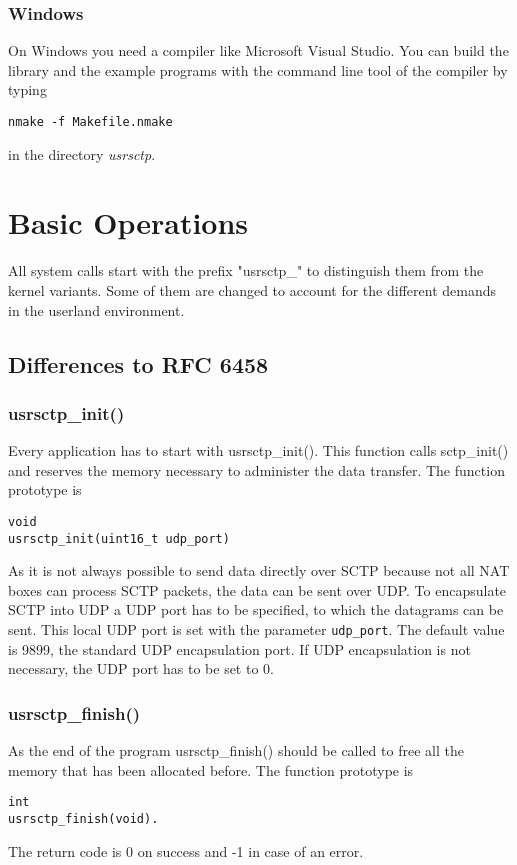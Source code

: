 \documentclass[a4paper]{article}
\begin{document}
\subsubsection{Windows}
On Windows you need a compiler like Microsoft Visual Studio. You can build the library and the
example programs with the command line tool of the compiler by typing
\begin{verbatim}
nmake -f Makefile.nmake
\end{verbatim}
in the directory \textit{usrsctp}.




\section{Basic Operations}
All system calls start with the prefix "usrsctp\_" to distinguish them from the kernel variants. 
Some of them are changed to account for the different demands in the userland environment. 

\subsection{Differences to RFC 6458}
\subsubsection{usrsctp\_init()}
Every application has to start with usrsctp\_init(). This function calls sctp\_init() and reserves
the memory necessary to administer the data transfer.
The function prototype is 
\begin{verbatim}
void
usrsctp_init(uint16_t udp_port)
\end{verbatim}
As it is not always possible to send data directly over SCTP because not all NAT boxes can
process SCTP packets, the data can be sent over UDP. To encapsulate SCTP into UDP
a UDP port has to be specified, to which the datagrams can be sent. This local UDP port  is set 
with the parameter \texttt{udp\_port}. The default value is 9899, the standard UDP encapsulation port.
If UDP encapsulation is not necessary, the UDP port has to be set to 0.

\subsubsection{usrsctp\_finish()}
As the end of the program usrsctp\_finish() should be called to free all the memory that has been
allocated before.
The function prototype is 
\begin{verbatim}
int
usrsctp_finish(void).
\end{verbatim}
The return code is 0 on success and -1 in case of an error.
\end{document}
